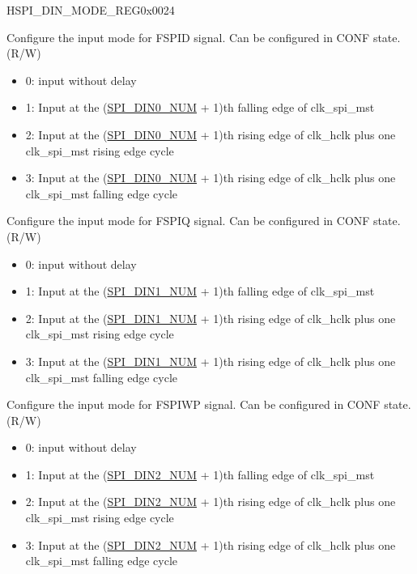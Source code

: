 \begin{register}{H}{SPI\_DIN\_MODE\_REG}{0x0024}\label{regdesc:SPIDINMODEREG}
%
%
%
%
%
%
%
\regnewline%
\begin{regdesc}\begin{reglist}
\label{fielddesc:SPIDIN0MODE}\item [SPI\_DIN0\_MODE] Configure the input mode for FSPID signal. Can be configured in CONF state. (R/W)
\begin{itemize}
    \item 0: input without delay
    \item 1: Input at the (\hyperref[fielddesc:SPIDIN0NUM]{SPI\_DIN0\_NUM} + 1)th falling edge of clk\_spi\_mst
    \item 2: Input at the (\hyperref[fielddesc:SPIDIN0NUM]{SPI\_DIN0\_NUM} + 1)th rising edge of clk\_hclk plus one clk\_spi\_mst rising edge cycle
    \item 3: Input at the (\hyperref[fielddesc:SPIDIN0NUM]{SPI\_DIN0\_NUM} + 1)th rising edge of clk\_hclk plus one clk\_spi\_mst falling edge cycle
\end{itemize}
\label{fielddesc:SPIDIN1MODE}\item [SPI\_DIN1\_MODE] Configure the input mode for FSPIQ signal. Can be configured in CONF state. (R/W)
\begin{itemize}
    \item 0: input without delay
    \item 1: Input at the (\hyperref[fielddesc:SPIDIN1NUM]{SPI\_DIN1\_NUM} + 1)th falling edge of clk\_spi\_mst
    \item 2: Input at the (\hyperref[fielddesc:SPIDIN1NUM]{SPI\_DIN1\_NUM} + 1)th rising edge of clk\_hclk plus one clk\_spi\_mst rising edge cycle
    \item 3: Input at the (\hyperref[fielddesc:SPIDIN1NUM]{SPI\_DIN1\_NUM} + 1)th rising edge of clk\_hclk plus one clk\_spi\_mst falling edge cycle
\end{itemize}
\label{fielddesc:SPIDIN2MODE}\item [SPI\_DIN2\_MODE] Configure the input mode for FSPIWP signal. Can be configured in CONF state. (R/W)
\begin{itemize}
    \item 0: input without delay
    \item 1: Input at the (\hyperref[fielddesc:SPIDIN2NUM]{SPI\_DIN2\_NUM} + 1)th falling edge of clk\_spi\_mst
    \item 2: Input at the (\hyperref[fielddesc:SPIDIN2NUM]{SPI\_DIN2\_NUM} + 1)th rising edge of clk\_hclk plus one clk\_spi\_mst rising edge cycle
    \item 3: Input at the (\hyperref[fielddesc:SPIDIN2NUM]{SPI\_DIN2\_NUM} + 1)th rising edge of clk\_hclk plus one clk\_spi\_mst falling edge cycle
\end{itemize}


\end{reglist}
\end{regdesc}
\end{register}
